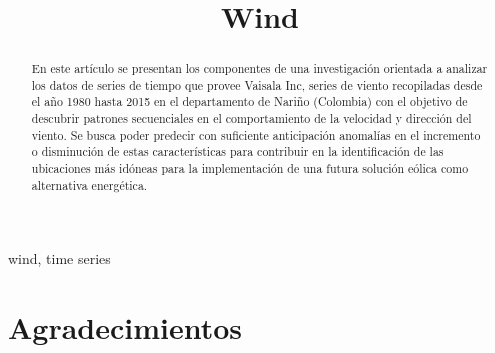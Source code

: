 \documentclass[conference]{IEEEtran}
\begin{document}
\pagestyle{empty}  


\title{Wind}

\author{
\and
{}
}

\maketitle

\begin{abstract}

En este artículo se presentan los componentes de una investigación orientada
 a analizar los datos de series de tiempo que provee Vaisala Inc, series de viento recopiladas desde
 el año 1980 hasta 2015 en el departamento de Nariño (Colombia) con el objetivo
 de descubrir patrones secuenciales en el comportamiento de la velocidad
 y dirección del viento.
 Se busca poder predecir con suficiente anticipación anomalías en el incremento
 o disminución de estas características para contribuir en la identificación
 de las ubicaciones más idóneas para la implementación de una futura solución
 eólica como alternativa energética.
\end{abstract}
 


\begin{IEEEkeywords}
wind, time series 
\end{IEEEkeywords}

\thispagestyle{empty} 

\IEEEpeerreviewmaketitle









\ifCLASSOPTIONcompsoc
  \section*{Agradecimientos}
\else
\end{document}
